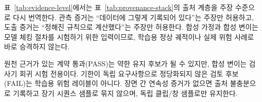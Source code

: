 표~\ref{tab:evidence-level}에서는 표~\ref{tab:provenance-stack}의 출처 계층을 주장 수준으로 다시 번역한다. 관측 증거는 ``데이터에 그렇게 기록되어 있다''는 주장만 허용하고, 도출 증거는 ``정해진 규칙으로 계산했다''는 주장만 허용한다. 합성 가정과 합성 변이는 모델 체킹 절차를 시험하기 위한 입력이므로, 학습용 정상 궤적이나 실제 위험 사례로 바로 승격하지 않는다.

원천 근거가 있는 계약 통과(PASS)는 약한 유지 후보가 될 수 있지만, 합성 변이는 검사기 회귀 시험 전용이다. 기한이 독립 요구사항으로 정당화되지 않은 검토 후보(FAIL)는 학습용 위험 레이블이 아니다. 장면 간 연속성 증거가 없으면 출처 불충분으로 기록하고 장기 시퀀스 샘플로 묶지 않으며, 독립 클립/창 샘플로만 유지한다.
